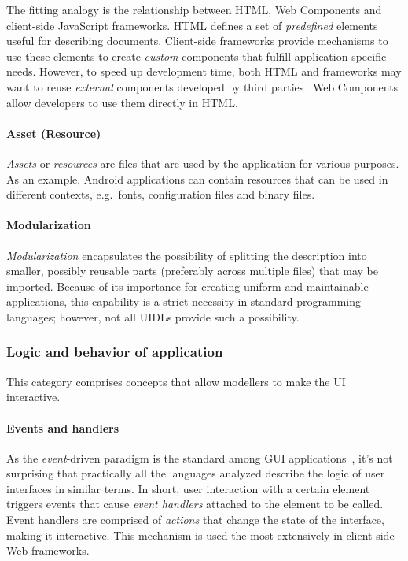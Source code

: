 The fitting analogy is the relationship between HTML, Web Components and client-side JavaScript frameworks.
HTML defines a set of \emph{predefined} elements useful for describing documents.
Client-side frameworks provide mechanisms to use these elements to create \emph{custom} components that fulfill application-specific needs.
However, to speed up development time, both HTML and frameworks may want to reuse \emph{external} components developed by third parties \textendash\ Web Components allow developers to use them directly in HTML\@.

\paragraph{Asset (Resource)}
\emph{Assets} or \emph{resources} are files that are used by the application for various purposes.
As an example, Android applications can contain resources that can be used in different contexts, e.g.\ fonts, configuration files and binary files.

\paragraph{Modularization}
\emph{Modularization} encapsulates the possibility of splitting the description into smaller, possibly reusable parts (preferably across multiple files) that may be imported.
Because of its importance for creating uniform and maintainable applications, this capability is a strict necessity in standard programming languages;
however, not all UIDLs provide such a possibility.

\subsubsection{Logic and behavior of application}

This category comprises concepts that allow modellers to make the UI interactive.

\paragraph{Events and handlers}
As the \emph{event}-driven paradigm is the standard among GUI applications~\cite{wang2016event}, it's not surprising that practically all the languages analyzed describe the logic of user interfaces in similar terms.
In short, user interaction with a certain element triggers events that cause \emph{event handlers} attached to the element to be called.
Event handlers are comprised of \emph{actions} that change the state of the interface, making it interactive.
This mechanism is used the most extensively in client-side Web frameworks.

